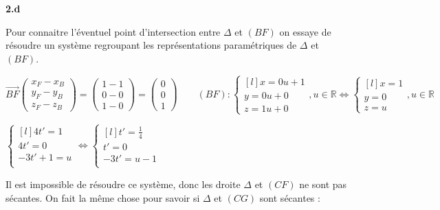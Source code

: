 \documentclass{article}
\begin{document}
\textbf{2.d}

\vspace{2mm}

\noindent Pour connaitre l'éventuel point d'intersection entre $\Delta$ et $(BF)$ on essaye de résoudre un système regroupant les représentations paramétriques de $\Delta$ et $(BF)$.

\vspace{2mm}

$\overrightarrow{BF}
\begin{pmatrix}
   x_F-x_B\\
   y_F-y_B\\
   z_F-z_B
\end{pmatrix}
=
\begin{pmatrix}
   1 - 1\\
   0 - 0\\
   1 - 0
\end{pmatrix}
= 
\begin{pmatrix}
   0\\
   0\\
   1
\end{pmatrix}
\qquad
(BF):\left\{\begin{matrix*}[l]
x = 0u + 1\\
y = 0u + 0\\
z = 1u + 0
\end{matrix*}
\right., u \in \mathbb{R}
\Leftrightarrow \left\{\begin{matrix*}[l]
x = 1\\
y = 0\\
z = u
\end{matrix*}
\right., u \in \mathbb{R}
$

\vspace{2mm}

$
\left\{\begin{matrix*}[l]
   4t'=1\\
   4t'=0\\
   -3t'+1=u\\
\end{matrix*}\right.
\Leftrightarrow
\left\{\begin{matrix*}[l]
   t' = \frac{1}{4}\\
   t' = 0\\
   -3t' = u - 1\\
\end{matrix*}\right.
$

\vspace{2mm}

\noindent Il est impossible de résoudre ce système, donc les droite $\Delta$ et $(CF)$ ne sont pas sécantes. On fait la même chose pour savoir si $\Delta$ et $(CG)$ sont sécantes :
\end{document}
